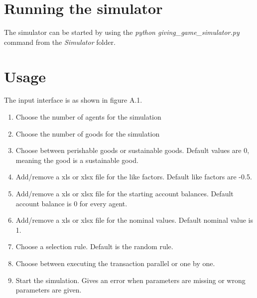 \documentclass[twoside,openright]{uva-bachelor-thesis}
\begin{document}
\section{Running the simulator}
The simulator can be started by using the \textit{python giving\_game\_simulator.py} command from the \textit{Simulator} folder.

\section{Usage}
The input interface is as shown in figure A.1.
\begin{enumerate}
\item Choose the number of agents for the simulation
\item Choose the number of goods for the simulation
\item Choose between perishable goods or sustainable goods. Default values are 0, meaning the good is a sustainable good.
\item Add/remove a xls or xlsx file for the like factors. Default like factors are -0.5.
\item Add/remove a xls or xlsx file for the starting account balances. Default account balance is 0 for every agent.
\item Add/remove a xls or xlsx file for the nominal values. Default nominal value is 1.
\item Choose a selection rule. Default is the random rule.
\item Choose between executing the transaction parallel or one by one.
\item Start the simulation. Gives an error when parameters are missing or wrong parameters are given.
\end{enumerate}
\end{document}

